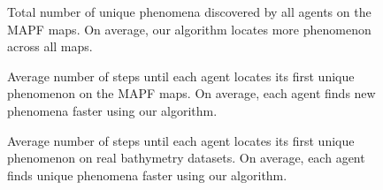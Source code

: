 \documentclass[letterpaper, 10 pt, conference]{IEEEConference}
\begin{document}

\begin{figure}[h]
    \centering  
    
    \caption{Total number of unique phenomena discovered by all agents on the MAPF maps. On average, our algorithm locates more phenomenon across all maps.}
    \label{fig:phenomenons_discovered_mapf}
\end{figure}

\begin{figure}[h]
    \centering  
    
    \caption{Average number of steps until each agent locates its first unique phenomenon on the MAPF maps. On average, each agent finds new phenomena faster using our algorithm.}
    \label{fig:step_to_first_gp_mapf}
\end{figure}

\begin{figure}[h]
    \centering  
    
    \caption{Average number of steps until each agent locates its first unique phenomenon on real bathymetry datasets. On average, each agent finds unique phenomena faster using our algorithm.}
    \label{fig:step_to_first_gp_real}
\end{figure}
\end{document}

